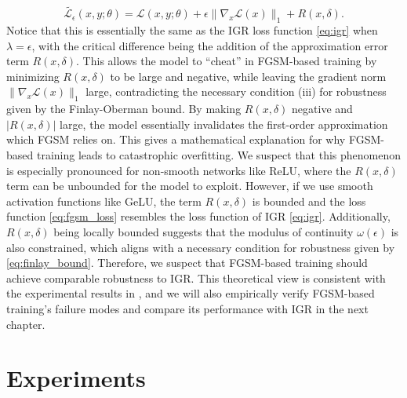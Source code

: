 \documentclass{article}
\begin{document}
\begin{equation}
  \tilde{\mathcal{L}_{\epsilon}}(x, y; \theta) = \mathcal{L}(x, y; \theta) + \epsilon \|\nabla_x \mathcal{L}(x)\|_1 + R(x, \delta). \label{eq:fgsm_loss}
\end{equation}
Notice that this is essentially the same as the IGR loss function \eqref{eq:igr} when $\lambda = \epsilon$, with the critical difference being the addition of the approximation error term $R(x, \delta)$. This allows the model to ``cheat'' in FGSM-based training by minimizing $R(x, \delta)$ to be large and negative, while leaving the gradient norm $\|\nabla_x \mathcal{L}(x)\|_1$ large, contradicting the necessary condition (iii) for robustness given by the Finlay-Oberman bound. By making $R(x, \delta)$ negative and $|R(x, \delta)|$ large, the model essentially invalidates the first-order approximation which FGSM relies on. This gives a mathematical explanation for why FGSM-based training leads to catastrophic overfitting. We suspect that this phenomenon is especially pronounced for non-smooth networks like ReLU, where the $R(x, \delta)$ term can be unbounded for the model to exploit. However, if we use smooth activation functions like GeLU, the term $R(x, \delta)$ is bounded and the loss function \eqref{eq:fgsm_loss} resembles the loss function of IGR \eqref{eq:igr}. Additionally, $R(x, \delta)$ being locally bounded suggests that the modulus of continuity $\omega(\epsilon)$ is also constrained, which aligns with a necessary condition for robustness given by \eqref{eq:finlay_bound}. Therefore, we suspect that FGSM-based training should achieve comparable robustness to IGR. This theoretical view is consistent with the experimental results in \cite{xie2021smoothadversarialtraining}, and we will also empirically verify FGSM-based training's failure modes and compare its performance with IGR in the next chapter.

\section{Experiments}
\end{document}
